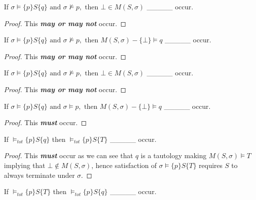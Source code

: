 \documentclass[12pt]{article}
\newenvironment{exercise}[2][Exercise]{\begin{trivlist}
\item[\hskip \labelsep {\bfseries #1}\hskip \labelsep {\bfseries #2.}]}{\end{trivlist}}
\begin{document}
\begin{exercise}{2}
If $\sigma \models \{p\} S \{q\} \text{ and } \sigma \not\models p, \text{ then } \bot \in M(S, \sigma)$ \_\_\_\_\_ occur.
\end{exercise}
 
\begin{proof}
This \textit{\textbf{may or may not}} occur.
\end{proof}

\begin{exercise}{3}
If $\sigma \models \{p\} S \{q\} \text{ and } \sigma \not\models p, \text{ then } M(S, \sigma) - \{\bot\} \models q$ \_\_\_\_\_ occur.
\end{exercise}

\begin{proof}
This \textit{\textbf{may or may not}} occur.
\end{proof}
 
\begin{exercise}{4}
If $\sigma \models \{p\} S \{q\} \text{ and } \sigma \not\models p, \text{ then } \bot \in M(S, \sigma)$ \_\_\_\_\_ occur.
\end{exercise}

\begin{proof}
This \textit{\textbf{may or may not}} occur.
\end{proof}

\begin{exercise}{5}
If $\sigma \models \{p\} S \{q\} \text{ and } \sigma \models p, \text{ then } M(S, \sigma) - \{\bot\} \models q$ \_\_\_\_\_ occur.
\end{exercise}

\begin{proof} 
This \textit{\textbf{must}} occur.
\end{proof}

\begin{exercise}{6}
If $\models_{tot} \{p\}S\{q\}$ then $\models_{tot} \{p\}S\{T\}$ \_\_\_\_\_ occur. 
\end{exercise}

\begin{proof}
This \textit{\textbf{must}} occur as we can see that $q$ is a tautology making $M(S, \sigma) \models T$ implying that $\bot \not\in M(S, \sigma)$, hence satisfaction of $\sigma \models \{p\}S\{T\}$ requires $S$ to always terminate under $\sigma$. 
\end{proof}

\begin{exercise}{7}
If $\models_{tot} \{p\}S\{T\}$ then $\models_{tot} \{p\}S\{q\}$ \_\_\_\_\_ occur.
\end{exercise}
\end{document}
